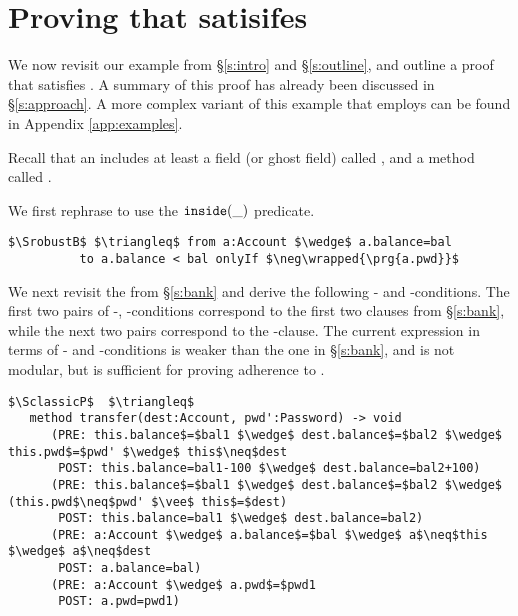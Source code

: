 \section{Proving that \ModC satisifes \SrobustB}
\label{s:examples}
We now revisit our example from  \S  \ref{s:intro} and \S \ref{s:outline},
and outline a proof that \ModC satisfies \SrobustB. 
A {summary} of this proof has already been discussed in \S \ref{s:approach}.
 A more complex variant of this example that employs   can be found in Appendix \ref{app:examples}.
  
 
 
Recall that an  includes %
 at least a  field  (or ghost field)  called , and a method called . 

%
 We first rephrase 
\SrobustB to use the $\texttt{inside}( \_ )$ predicate.
\begin{lstlisting}[language=Chainmail, mathescape=true, frame=lines]
$\SrobustB$ $\triangleq$ from a:Account $\wedge$ a.balance=bal 
          to a.balance < bal onlyIf $\neg\wrapped{\prg{a.pwd}}$
\end{lstlisting}

We next revisit the   \funcSpec from \S \ref{s:bank} and derive the following 
- and -conditions. The first two pairs of -, -conditions correspond to the first two 
clauses from \S \ref{s:bank}, while the next two pairs correspond to the -clause. The current expression in terms
of - and -conditions is weaker than the one in \S \ref{s:bank}, and is not modular, but is
sufficient for proving adherence to  \SrobustB.

\begin{lstlisting}[mathescape=true, frame=lines, language=Chainmail]
$\SclassicP$  $\triangleq$
   method transfer(dest:Account, pwd':Password) -> void  
      (PRE: this.balance$=$bal1 $\wedge$ dest.balance$=$bal2 $\wedge$ this.pwd$=$pwd' $\wedge$ this$\neq$dest
       POST: this.balance=bal1-100 $\wedge$ dest.balance=bal2+100)
      (PRE: this.balance$=$bal1 $\wedge$ dest.balance$=$bal2 $\wedge$ (this.pwd$\neq$pwd' $\vee$ this$=$dest)
       POST: this.balance=bal1 $\wedge$ dest.balance=bal2)
      (PRE: a:Account $\wedge$ a.balance$=$bal $\wedge$ a$\neq$this $\wedge$ a$\neq$dest 
       POST: a.balance=bal)          
      (PRE: a:Account $\wedge$ a.pwd$=$pwd1  
       POST: a.pwd=pwd1)         
\end{lstlisting}


